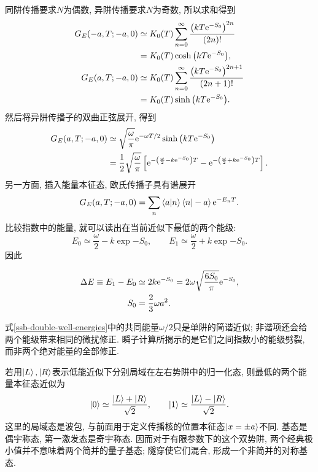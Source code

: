 同阱传播要求$N$为偶数, 异阱传播要求$N$为奇数, 所以求和得到
\begin{align}\label{ssb-instanton-sum}
    G_E(-a,T;-a,0)
    &\simeq K_0(T)\sum_{n=0}^\infty
      \frac{\big(kT\exp{-S_0}\big)^{2n}}{(2n)!}\notag\\
    &=K_0(T)\cosh\big(kT\exp{-S_0}\big),\notag\\
    G_E(a,T;-a,0)
    &\simeq K_0(T)\sum_{n=0}^\infty
      \frac{\big(kT\exp{-S_0}\big)^{2n+1}}{(2n+1)!}\notag\\
    &=K_0(T)\sinh\big(kT\exp{-S_0}\big).
\end{align}
然后将异阱传播子的双曲正弦展开, 得到
\begin{align}
    G_E(a,T;-a,0)
    &\simeq\sqrt{\frac\omega\pi}\exp{-\omega T/2}
      \sinh\big(kT\exp{-S_0}\big)\notag\\
    &=\frac12\sqrt{\frac\omega\pi}
      \left[\exp{-\left(\frac\omega2-k\exp{-S_0}\right)T}
      -\exp{-\left(\frac\omega2+k\exp{-S_0}\right)T}\right].
\end{align}
另一方面, 插入能量本征态, 欧氏传播子具有谱展开
\begin{equation}
    G_E(a,T;-a,0)
    =\sum_n\braket{a|n}\braket{n|-a}\exp{-E_nT}.
\end{equation}
比较指数中的能量, 就可以读出在当前近似下最低的两个能级:
\begin{equation}\label{ssb-double-well-energies}
    E_0\simeq\frac\omega2-k\exp{-S_0},\qquad
    E_1\simeq\frac\omega2+k\exp{-S_0}.
\end{equation}
因此
\begin{important}
    \begin{align}
        \Delta E\equiv E_1-E_0
        &\simeq2k\exp{-S_0}
        =2\omega\sqrt{\frac{6S_0}{\pi}}\exp{-S_0},\notag\\
        S_0&=\frac23\omega a^2.
    \end{align}
\end{important}
式\eqref{ssb-double-well-energies}中的共同能量$\omega/2$只是单阱的简谐近似; 非谐项还会给两个能级带来相同的微扰修正. 瞬子计算所揭示的是它们之间指数小的能级劈裂, 而非两个绝对能量的全部修正.

若用$\ket L,\ket R$表示低能近似下分别局域在左右势阱中的归一化态, 则最低的两个能量本征态近似为
\begin{equation}
    \ket0\simeq\frac{\ket L+\ket R}{\sqrt2},\qquad
    \ket1\simeq\frac{\ket L-\ket R}{\sqrt2}.
\end{equation}
这里的局域态是波包, 与前面用于定义传播核的位置本征态$\ket{x=\pm a}$不同. 基态是偶宇称态, 第一激发态是奇宇称态. 因而对于有限参数下的这个双势阱, 两个经典极小值并不意味着两个简并的量子基态; 隧穿使它们混合, 形成一个非简并的对称基态.

